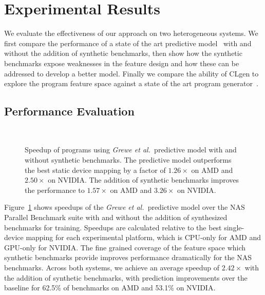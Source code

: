 \section{Experimental Results}%
\label{sec:results}

We evaluate the effectiveness of our approach on two heterogeneous systems. We first compare the performance of a state of the art predictive model~\cite{Grewe2013} with and without the addition of synthetic benchmarks, then show how the synthetic benchmarks expose weaknesses in the feature design and how these can be addressed to develop a better model. Finally we compare the ability of CLgen to explore the program feature space against a state of the art program generator~\cite{Lidbury2015a}.

\subsection{Performance Evaluation}%
\label{subsec:eval-cgo13}

\begin{figure}
  \centering %
  \\%
  \caption{Speedup of programs using \emph{Grewe et al.\ }predictive model with and without synthetic benchmarks. The predictive model outperforms the best static device mapping by a factor of $1.26\times$ on AMD and $2.50\times$ on NVIDIA. The addition of synthetic benchmarks improves the performance to $1.57\times$ on AMD and $3.26\times$ on NVIDIA.}%
  \label{fig:npb} %
\end{figure}

Figure~\ref{fig:npb} shows speedups of the \emph{Grewe et al.\ }predictive model over the NAS Parallel Benchmark suite with and without the addition of synthesized benchmarks for training. Speedups are calculated relative to the best single-device mapping for each experimental platform, which is CPU-only
for AMD and GPU-only for NVIDIA. The fine grained coverage of the feature space which synthetic benchmarks provide improves performance dramatically for the NAS benchmarks. Across both systems, we achieve an average speedup of $2.42\times$ with the addition of synthetic benchmarks, with prediction improvements over the baseline for 62.5\% of benchmarks on AMD and 53.1\% on NVIDIA.

